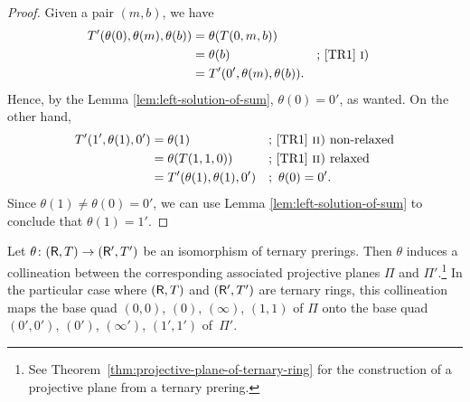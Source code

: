 \begin{proof}
    Given a pair $(m,b)$, we have
    \begin{align*}
        T'(\theta(0),\theta(m),\theta(b)) &= \theta(T(0,m,b))\\
            &=\theta(b) 
                &&\text{; \ref{TR1} \textsc i)}\\
            &= T'(0',\theta(m),\theta(b)).
    \end{align*}
    Hence, by the Lemma \ref{lem:left-solution-of-sum}, $\theta(0)=0'$, as wanted. On the other hand,
    \begin{align*}
        T'(1',\theta(1),0') &= \theta(1)
                &&\text{; \ref{TR1} \textsc{ii)} non-relaxed}\\
            &= \theta(T(1,1,0))
                &&\text{; \ref{TR1} \textsc{ii)} relaxed}\\
            &= T'(\theta(1),\theta(1),0')
                &&;\ \theta(0)=0'.
    \end{align*}
    Since $\theta(1)\ne\theta(0)=0'$, we can use Lemma \ref{lem:left-solution-of-sum} to conclude that $\theta(1)=1'$.
\end{proof}

\begin{prop}\label{prop:coorinatized-isomorphism}
    Let\/ $\theta\colon (\mathsf R,T)\to(\mathsf R',T')$ be an isomorphism of ternary prerings. Then\/ $\theta$ induces a collineation between the corresponding associated projective planes\/ $\Pi$ and\/ $\Pi'$.\footnote{See {\upshape Theorem~\ref{thm:projective-plane-of-ternary-ring}} for the construction of a projective plane from a ternary prering.} In the particular case where\/ $(\mathsf R,T)$ and\/ $(\mathsf R',T')$ are ternary rings, this collineation maps the base quad\/ $(0,0)$, $(0)$, $(\infty)$, $(1,1)$ of\/ $\Pi$ onto the base quad\/ $(0',0')$, $(0')$, $(\infty')$, $(1',1')$ of\/~$\Pi'$.
\end{prop}



